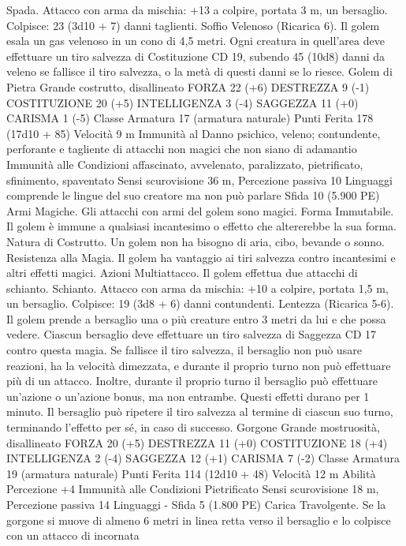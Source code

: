 \begin{multicols}{2}
Spada. Attacco con arma da mischia: +13 a colpire, portata 3 m,
un bersaglio.
Colpisce: 23 (3d10 + 7) danni taglienti.
Soffio Velenoso (Ricarica 6). Il golem esala un gas velenoso in
un cono di 4,5 metri. Ogni creatura in quell’area deve effettuare
un tiro salvezza di Costituzione CD 19, subendo 45 (10d8) danni
da veleno se fallisce il tiro salvezza, o la metà di questi danni se
lo riesce.
Golem di Pietra
Grande costrutto, disallineato
FORZA 22 (+6)
DESTREZZA 9 (-1)
COSTITUZIONE 20 (+5)
INTELLIGENZA 3 (-4)
SAGGEZZA 11 (+0)
CARISMA 1 (-5)
Classe Armatura 17 (armatura naturale)
Punti Ferita 178 (17d10 + 85)
Velocità 9 m
Immunità al Danno psichico, veleno; contundente, perforante e
tagliente di attacchi non magici che non siano di adamantio
Immunità alle Condizioni affascinato, avvelenato, paralizzato,
pietrificato, sfinimento, spaventato
Sensi scurovisione 36 m, Percezione passiva 10
Linguaggi comprende le lingue del suo creatore ma non può
parlare
Sfida 10 (5.900 PE)
Armi Magiche. Gli attacchi con armi del golem sono magici.
Forma Immutabile. Il golem è immune a qualsiasi incantesimo o
effetto che altererebbe la sua forma.
Natura di Costrutto. Un golem non ha bisogno di aria, cibo,
bevande o sonno.
Resistenza alla Magia. Il golem ha vantaggio ai tiri salvezza
contro incantesimi e altri effetti magici.
Azioni
Multiattacco. Il golem effettua due attacchi di schianto.
Schianto. Attacco con arma da mischia: +10 a colpire, portata
1,5 m, un bersaglio.
Colpisce: 19 (3d8 + 6) danni contundenti.
Lentezza (Ricarica 5-6). Il golem prende a bersaglio una o più
creature entro 3 metri da lui e che possa vedere. Ciascun
bersaglio deve effettuare un tiro salvezza di Saggezza CD 17
contro questa magia. Se fallisce il tiro salvezza, il bersaglio non
può usare reazioni, ha la velocità dimezzata, e durante il proprio
turno non può effettuare più di un attacco. Inoltre, durante il
proprio turno il bersaglio può effettuare un’azione o un’azione
bonus, ma non entrambe. Questi effetti durano per 1 minuto. Il
bersaglio può ripetere il tiro salvezza al termine di ciascun suo
turno, terminando l’effetto per sé, in caso di successo.
Gorgone
Grande mostruosità, disallineato
FORZA 20 (+5)
DESTREZZA 11 (+0)
COSTITUZIONE 18 (+4)
INTELLIGENZA 2 (-4)
SAGGEZZA 12 (+1)
CARISMA 7 (-2)
Classe Armatura 19 (armatura naturale)
Punti Ferita 114 (12d10 + 48)
Velocità 12 m
Abilità Percezione +4
Immunità alle Condizioni Pietrificato
Sensi scurovisione 18 m, Percezione passiva 14
Linguaggi -
Sfida 5 (1.800 PE)
Carica Travolgente. Se la gorgone si muove di almeno 6 metri in
linea retta verso il bersaglio e lo colpisce con un attacco di incornata

\end{multicols}

